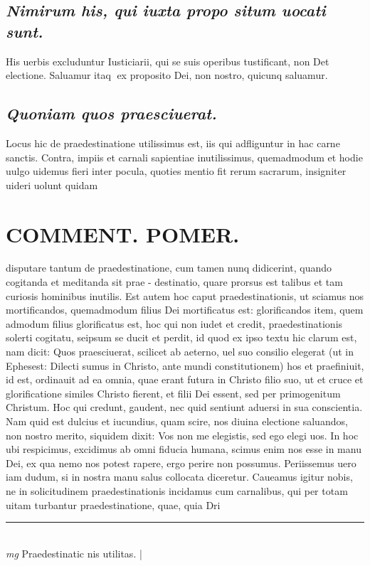 \documentclass{article}
\begin{document}
\begin{pages}
\subsection*{\textit{Nimirum his, qui iuxta propo situm uocati sunt. }}\pstart His uerbis excluduntur Iusticiarii, qui se suis operibus tustificant, non Det electione. Saluamur itaq ex proposito Dei, non nostro, quicunq saluamur.   \pend
{}
{}
\subsection*{\textit{Quoniam quos praesciuerat. }}\pstart Locus hic de praedestinatione utilissimus est, iis qui adfliguntur in hac carne sanctis. Contra, impiis et carnali sapientiae inutilissimus, quemadmodum et hodie uulgo uidemus fieri inter pocula, quoties mentio fit rerum sacrarum, insigniter uideri uolunt quidam  \pend
\section*{COMMENT. POMER.  }\pstart disputare tantum de praedestinatione, cum tamen nunq didicerint, quando cogitanda et meditanda sit prae - destinatio, quare prorsus est talibus et tam curiosis hominibus inutilis. Est autem hoc caput praedestinationis, ut sciamus nos mortificandos, quemadmodum filius Dei mortificatus est: glorificandos item, quem admodum filius glorificatus est, hoc qui non iudet et credit, praedestinationis solerti cogitatu, seipsum se ducit et perdit, id quod ex ipso textu hic clarum est, nam dicit: Quos praesciuerat, scilicet ab aeterno, uel suo consilio elegerat (ut in Ephesest: Dilecti sumus in Christo, ante mundi constitutionem) hos et praefiniuit, id est, ordinauit ad ea omnia, quae erant futura in Christo filio suo, ut et cruce et glorificatione similes Christo fierent, et filii Dei essent, sed per primogenitum Christum. Hoc qui credunt, gaudent, nec quid sentiunt aduersi in sua conscientia. Nam quid est dulcius et iucundius, quam scire, nos diuina electione saluandos, non nostro merito, siquidem dixit: Vos non me elegistis, sed ego elegi uos. In hoc ubi respicimus, excidimus ab omni fiducia humana, scimus enim nos esse in manu Dei, ex qua nemo nos potest rapere, ergo perire non possumus. Periissemus uero iam dudum, si in nostra manu salus collocata diceretur. Caueamus igitur nobis, ne in solicitudinem praedestinationis incidamus cum carnalibus, qui per totam uitam turbantur praedestinatione, quae, quia Dri  \pend
\vspace{0.5cm}\noindent
\vspace{0.2cm}\rule{1cm}{0.2pt}\\ 
\hspace{0.2cm}\textit{mg}
\footnotesize Praedestinatic nis utilitas. 
\normalsize| 

\end{pages}
\end{document}
